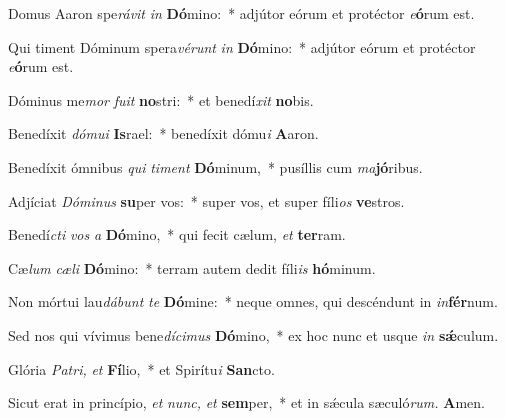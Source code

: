 \item Domus Aaron spe\tinyhspace\textit{rávit} \textit{in} \textbf{Dó}mino:~* adjútor eórum et protéctor \textit{e}\textbf{ó}rum est.
\item Qui timent Dóminum spera\tinyhspace\textit{vérunt} \textit{in} \textbf{Dó}mino:~* adjútor eórum et protéctor \textit{e}\textbf{ó}rum est.
\item Dóminus me\tinyhspace\textit{mor} \textit{fuit} \textbf{no}stri:~* et benedí\tinyhspace\textit{xit} \textbf{no}bis.
\item Benedíxit \textit{dómui} \textbf{Is}rael:~* benedíxit dómu\textit{i} \textbf{A}aron.
\item Benedíxit ómnibus \textit{qui} \textit{timent} \textbf{Dó}minum,~* pusíllis cum \textit{ma}\textbf{jó}ribus.
\item Adjíciat \textit{Dóminus} \textbf{su}per vos:~* super vos, et super fíli\textit{os} \textbf{ve}stros.
\item Benedí\tinyhspace\textit{cti} \textit{vos} \textit{a} \textbf{Dó}mino,~* qui fecit cælum, \textit{et} \textbf{ter}ram.
\item Cæ\tinyhspace\textit{lum} \textit{cæli} \textbf{Dó}mino:~* terram autem dedit fíli\textit{is} \textbf{hó}minum.
\item Non mórtui lau\tinyhspace\textit{dábunt} \textit{te} \textbf{Dó}mine:~* neque omnes, qui descéndunt in \textit{in}\textbf{fér}num.
\item Sed nos qui vívimus bene\tinyhspace\tinyhspace\textit{dícimus} \textbf{Dó}mino,~* ex hoc nunc et usque \textit{in} \textbf{sǽ}culum.
\item Glória \textit{Patri,} \textit{et} \textbf{Fí}lio,~* et Spirítu\tinyhspace\textit{i} \textbf{San}cto.
\item Sicut erat in princípio, \textit{et} \textit{nunc,} \textit{et} \textbf{sem}per,~* et in sǽcula sæculó\textit{rum.} \textbf{A}men.
